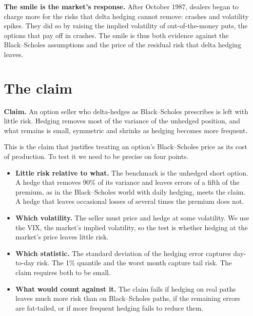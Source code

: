 \textbf{The smile is the market's response.} After October 1987, dealers began to charge more for the risks that delta hedging cannot remove: crashes and volatility spikes. They did so by raising the implied volatility of out-of-the-money puts, the options that pay off in crashes. The smile is thus both evidence against the Black--Scholes assumptions and the price of the residual risk that delta hedging leaves.

\section{The claim}
\label{sec:17-claim}

\begin{callout}
\textbf{Claim.} An option seller who delta-hedges as Black--Scholes prescribes is left with little risk. Hedging removes most of the variance of the unhedged position, and what remains is small, symmetric and shrinks as hedging becomes more frequent.
\end{callout}

This is the claim that justifies treating an option's Black--Scholes price as its cost of production. To test it we need to be precise on four points.

\begin{itemize}
  \item \textbf{Little risk relative to what.} The benchmark is the unhedged short option. A hedge that removes 90\% of its variance and leaves errors of a fifth of the premium, as in the Black--Scholes world with daily hedging, meets the claim. A hedge that leaves occasional losses of several times the premium does not.
  \item \textbf{Which volatility.} The seller must price and hedge at some volatility. We use the VIX, the market's implied volatility, so the test is whether hedging at the market's price leaves little risk.
  \item \textbf{Which statistic.} The standard deviation of the hedging error captures day-to-day risk. The 1\% quantile and the worst month capture tail risk. The claim requires both to be small.
  \item \textbf{What would count against it.} The claim fails if hedging on real paths leaves much more risk than on Black--Scholes paths, if the remaining errors are fat-tailed, or if more frequent hedging fails to reduce them.
\end{itemize}

